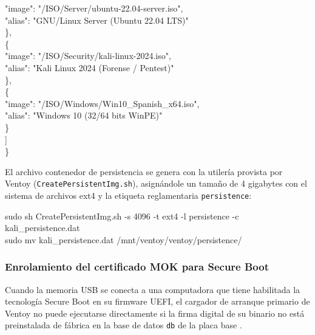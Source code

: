 \documentclass[12pt]{article}
\begin{document}
\begin{mdframed}[style=terminal]
\hspace*{3em}"image": "/ISO/Server/ubuntu-22.04-server.iso", \\
\hspace*{3em}"alias": "GNU/Linux Server (Ubuntu 22.04 LTS)" \\
\hspace*{2em}\}, \\
\hspace*{2em}\{ \\
\hspace*{3em}"image": "/ISO/Security/kali-linux-2024.iso", \\
\hspace*{3em}"alias": "Kali Linux 2024 (Forense / Pentest)" \\
\hspace*{2em}\}, \\
\hspace*{2em}\{ \\
\hspace*{3em}"image": "/ISO/Windows/Win10\_Spanish\_x64.iso", \\
\hspace*{3em}"alias": "Windows 10 (32/64 bits WinPE)" \\
\hspace*{2em}\} \\
\hspace*{1em}] \\
\}
\end{mdframed}

El archivo contenedor de persistencia se genera con la utilería provista por Ventoy (\texttt{CreatePersistentImg.sh}), asignándole un tamaño de 4 gigabytes con el sistema de archivos ext4 y la etiqueta reglamentaria \texttt{persistence}:

\begin{mdframed}[style=terminal]
\ttfamily\upshape\color{bashLetterColor}\footnotesize
sudo sh CreatePersistentImg.sh -s 4096 -t ext4 -l persistence -c kali\_persistence.dat \\
sudo mv kali\_persistence.dat /mnt/ventoy/ventoy/persistence/
\end{mdframed}

\subsubsection{Enrolamiento del certificado MOK para Secure Boot}

Cuando la memoria USB se conecta a una computadora que tiene habilitada la tecnología Secure Boot en su firmware UEFI, el cargador de arranque primario de Ventoy no puede ejecutarse directamente si la firma digital de su binario no está preinstalada de fábrica en la base de datos \texttt{db} de la placa base \parencite{ventoy2024documentation}.
\end{document}
